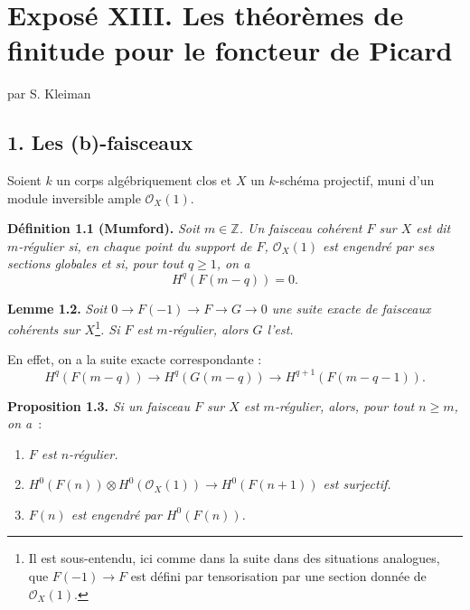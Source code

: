 \section*{Expos\'e XIII. Les th\'eor\`emes de finitude pour le foncteur de Picard}
\begin{center}
par S. Kleiman
\end{center}

\subsection*{1. Les (b)-faisceaux}
Soient $k$ un corps alg\'ebriquement clos et $X$ un $k$-sch\'ema projectif, muni d'un module inversible ample $\mathcal O_X(1)$.

\textbf{D\'efinition 1.1 (Mumford).} \emph{Soit $m\in\mathbb Z$. Un faisceau coh\'erent $F$ sur $X$ est dit \emph{$m$-r\'egulier} si, en chaque point du support de $F$, $\mathcal O_X(1)$ est engendr\'e par ses sections globales et si, pour tout $q\ge1$, on a}
\[
 H^q(F(m-q))=0.
\]

\textbf{Lemme 1.2.} \emph{Soit \(0\longrightarrow F(-1)\longrightarrow F\longrightarrow G\longrightarrow 0\) une suite exacte de faisceaux coh\'erents sur $X$}\footnote{Il est sous-entendu, ici comme dans la suite dans des situations analogues, que \(F(-1)\to F\) est d\'efini par tensorisation par une section donn\'ee de \(\mathcal O_X(1)\).}\emph{. Si $F$ est $m$-r\'egulier, alors $G$ l'est.}

En effet, on a la suite exacte correspondante :
\[
H^q(F(m-q))\longrightarrow H^q(G(m-q))\longrightarrow H^{q+1}(F(m-q-1)).
\]

\textbf{Proposition 1.3.} \emph{Si un faisceau $F$ sur $X$ est $m$-r\'egulier, alors, pour tout $n\ge m$, on a}~:
\begin{enumerate}[label=(\roman*)]
\item \emph{$F$ est $n$-r\'egulier.}
\item \emph{\(H^0(F(n))\otimes H^0(\mathcal O_X(1))\longrightarrow H^0(F(n+1))\) est surjectif.}
\item \emph{$F(n)$ est engendr\'e par \(H^0(F(n))\).}
\end{enumerate}

